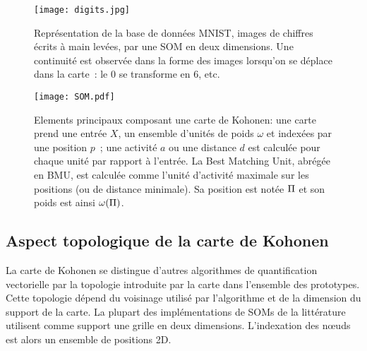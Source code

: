 \documentclass[../main]{subfiles}
\begin{document}
\begin{figure}
\centering
\texttt{[image: digits.jpg]}
\caption{Représentation de la base de données MNIST, images de chiffres écrits à main levées, par une SOM en deux dimensions. Une continuité est observée dans la forme des images lorsqu'on se déplace dans la carte~: le $0$ se transforme en $6$, etc.}
\label{fig:SOM}
\end{figure}

\begin{figure}
    \centering
    \texttt{[image: SOM.pdf]}
    \caption{Elements principaux composant une carte de Kohonen: une carte prend une entrée $X$, un ensemble d'unités de poids $\omega$ et indexées par une position $p$~; une activité $a$ ou une distance $d$ est calculée pour chaque unité par rapport à l'entrée. La Best Matching Unit, abrégée en BMU, est calculée comme l'unité d'activité maximale sur les positions (ou de distance minimale). Sa position est notée $\Pi$ et son poids est ainsi $\omega(\Pi)$.}
    \label{fig:SOM}
    \end{figure}
    

\subsection{Aspect topologique de la carte de Kohonen}

La carte de Kohonen se distingue d'autres algorithmes de quantification vectorielle par la topologie introduite par la carte dans l'ensemble des prototypes. Cette topologie dépend du voisinage utilisé par l'algorithme et de la dimension du support de la carte.
La plupart des implémentations de SOMs de la littérature utilisent comme support une grille en deux dimensions. L'indexation des n\oe{}uds est alors un ensemble de positions 2D.
\end{document}

